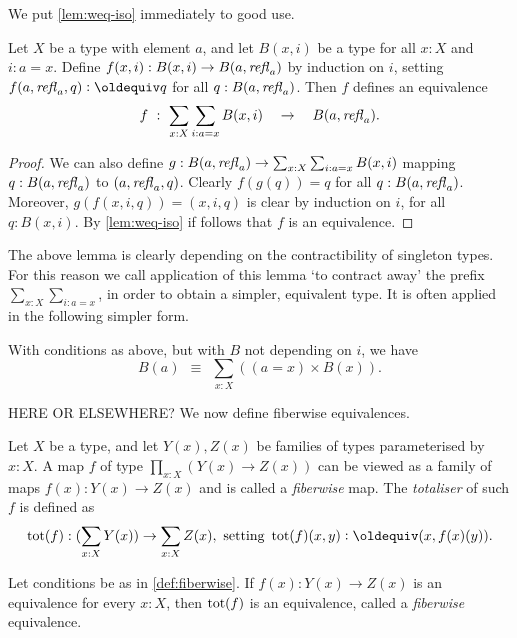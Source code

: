 We put \cref{lem:weq-iso} immediately to good use.

\begin{lemma}\label{lem:contract-away}
Let $X$ be a type with element $a$, and let
$B(x,i)$ be a type for all $x:X$ and $i: a=x$.
Define $f(x,i): B(x,i) \to B(a,\mathop{{\it refl}_{a}})$ by induction on $i$,
setting $f(a,\refl{a},q) \defeq q$ for all $q:B(a,\mathop{{\it refl}_{a}})$.
Then $f$ defines an equivalence 
\[
f~:~ \sum_{x:X} \sum_{i: a=x} B(x,i) \quad \to \quad B(a,\mathop{{\it refl}_{a}}).
\]
\end{lemma}
\begin{proof}
We can also define 
$g: B(a,\mathop{{\it refl}_{a}})\to \sum_{x:X} \sum_{i: a=x} B(x,i)$
mapping $q: B(a,\mathop{{\it refl}_{a}})$ to $(a,\mathop{{\it refl}_{a}},q)$.
Clearly $f(g(q))=q$ for all $q:B(a,\mathop{{\it refl}_{a}})$.
Moreover, $g(f(x,i,q))=(x,i,q)$ is clear by induction
on $i$, for all $q:B(x,i)$.
By \cref{lem:weq-iso} if follows that $f$
is an equivalence.
\end{proof}

The above lemma is clearly depending on the 
contractibility of singleton types. For this reason
we call application of this lemma `to contract away'
the prefix $\sum_{x:X} \sum_{i: a=x}$, in order
to obtain a simpler, equivalent type. It is often applied
in the following simpler form.

\begin{corollary}\label{cor:contract-away}
With conditions as above, but with $B$ not depending on $i$, we have
\[
 B(a)~~\equiv~~\sum_{x:X} ((a=x)\times B(x)).
\]
\end{corollary}

HERE OR ELSEWHERE? We now define fiberwise equivalences.

\begin{definition}\label{def:fiberwise}
Let $X$ be a type, and let $Y(x),Z(x)$ be families of types parameterised
by $x:X$. A map $f$ of type $\prod_{x:X}(Y(x)\to Z(x))$
can be viewed as a family of maps $f(x): Y(x)\to Z(x)$ and is called a 
\emph{fiberwise} map. The \emph{totaliser} of such $f$ is defined as
\[
\tot(f) : (\sum_{x:X} Y(x)) \to \sum_{x:X} Z(x),
\text{ setting } \tot(f)(x,y)\defeq (x,f(x)(y)).
\]

\end{definition}

\begin{lemma}\label{lem:fiberwise}
Let conditions be as in \cref{def:fiberwise}.
If $f(x): Y(x) \to Z(x)$ is an equivalence for every $x:X$,
then $\mathop{\mathrm{tot}}(f)$ is an equivalence,
called a \emph{fiberwise} equivalence.
\end{lemma}

